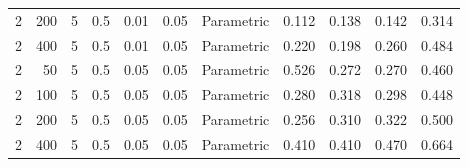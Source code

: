 \begin{table}
{{\begin{tabular}{rrrrrrlllll}
\hspace{1em}2 & 200 & 5 & 0.5 & 0.01 & 0.05 & Parametric & 0.112 & 0.138 & 0.142 & 0.314\\
\hspace{1em}2 & 400 & 5 & 0.5 & 0.01 & 0.05 & Parametric & 0.220 & 0.198 & 0.260 & 0.484\\
\hspace{1em}2 & 50 & 5 & 0.5 & 0.05 & 0.05 & Parametric & 0.526 & 0.272 & 0.270 & 0.460\\
\hspace{1em}2 & 100 & 5 & 0.5 & 0.05 & 0.05 & Parametric & 0.280 & 0.318 & 0.298 & 0.448\\
\hspace{1em}2 & 200 & 5 & 0.5 & 0.05 & 0.05 & Parametric & 0.256 & 0.310 & 0.322 & 0.500\\
\hspace{1em}2 & 400 & 5 & 0.5 & 0.05 & 0.05 & Parametric & 0.410 & 0.410 & 0.470 & 0.664\\
\bottomrule
\end{tabular}
}}
 \end{table}
